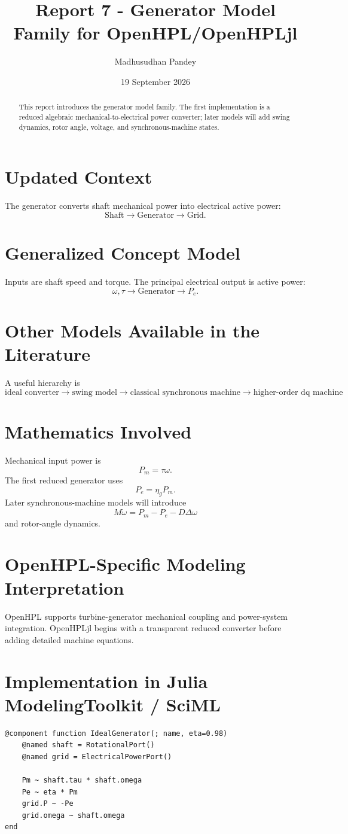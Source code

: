 \documentclass[11pt,a4paper]{article}
\title{Report 7 - Generator Model Family for OpenHPL/OpenHPLjl}
\author{Madhusudhan Pandey}
\date{19 September 2026}
\begin{document}
\maketitle
\begin{abstract}
This report introduces the generator model family. The first implementation is a reduced algebraic mechanical-to-electrical power converter; later models will add swing dynamics, rotor angle, voltage, and synchronous-machine states.
\end{abstract}
\section{Updated Context}
The generator converts shaft mechanical power into electrical active power:
\[
\boxed{\text{Shaft}\rightarrow\text{Generator}\rightarrow\text{Grid}}.
\]

\section{Generalized Concept Model}
Inputs are shaft speed and torque. The principal electrical output is active power:
\[
\omega,\tau\rightarrow\text{Generator}\rightarrow P_e.
\]

\section{Other Models Available in the Literature}
A useful hierarchy is
\[
\boxed{\text{ideal converter}\rightarrow\text{swing model}\rightarrow\text{classical synchronous machine}\rightarrow\text{higher-order dq machine}}.
\]

\section{Mathematics Involved}
Mechanical input power is
\[
P_m=\tau\omega.
\]
The first reduced generator uses
\[
\boxed{P_e=\eta_gP_m}.
\]
Later synchronous-machine models will introduce
\[
M\dot\omega=P_m-P_e-D\Delta\omega
\]
and rotor-angle dynamics.

\section{OpenHPL-Specific Modeling Interpretation}
OpenHPL supports turbine-generator mechanical coupling and power-system integration. OpenHPLjl begins with a transparent reduced converter before adding detailed machine equations.

\section{Implementation in Julia ModelingToolkit / SciML}
\begin{lstlisting}
@component function IdealGenerator(; name, eta=0.98)
    @named shaft = RotationalPort()
    @named grid = ElectricalPowerPort()

    Pm ~ shaft.tau * shaft.omega
    Pe ~ eta * Pm
    grid.P ~ -Pe
    grid.omega ~ shaft.omega
end
\end{lstlisting}
\end{document}
